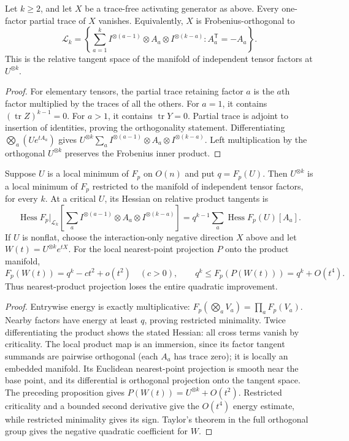 \begin{proposition}
Let $k\ge2$, and let $X$ be a trace-free activating generator as above.
Every one-factor partial trace of $X$ vanishes. Equivalently, $X$ is
Frobenius-orthogonal to
\[
 \mathcal L_k=\left\{
 \sum_{a=1}^k I^{\otimes(a-1)}\otimes A_a\otimes
 I^{\otimes(k-a)}: A_a^{\mathsf T}=-A_a\right\}.
\]
This is the relative tangent space of the manifold of independent
tensor factors at $U^{\otimes k}$.
\end{proposition}
\begin{proof}
For elementary tensors, the partial trace retaining factor $a$ is
the $a$th factor multiplied by the traces of all the others.
For $a=1$, it contains $(\operatorname{tr}Z)^{k-1}=0$.
For $a>1$, it contains $\operatorname{tr}Y=0$. Partial trace is adjoint
to insertion of identities, proving the orthogonality statement.
Differentiating $\bigotimes_a(Ue^{tA_a})$ gives
$U^{\otimes k}\sum_a I^{\otimes(a-1)}\otimes A_a\otimes
I^{\otimes(k-a)}$. Left multiplication by the orthogonal
$U^{\otimes k}$ preserves the Frobenius inner product.
\end{proof}

\begin{proposition}
Suppose $U$ is a local minimum of $F_p$ on $O(n)$ and put $q=F_p(U)$.
Then $U^{\otimes k}$ is a local minimum of $F_p$ restricted to the
manifold of independent tensor factors, for every $k$. At a critical
$U$, its Hessian on relative product tangents is
\[
 \operatorname{Hess}F_p\big|_{\mathcal L_k}
 \left[\sum_a I^{\otimes(a-1)}\otimes A_a\otimes
 I^{\otimes(k-a)}\right]
 =q^{k-1}\sum_a \operatorname{Hess}F_p(U)[A_a].
\]
If $U$ is nonflat, choose the interaction-only negative direction $X$
above and let $W(t)=U^{\otimes k}e^{tX}$. For the local nearest-point
projection $P$ onto the product manifold,
\[
 F_p(W(t))=q^k-c t^2+o(t^2)\quad(c>0),\qquad
 q^k\le F_p(P(W(t)))=q^k+O(t^4).
\]
Thus nearest-product projection loses the entire quadratic improvement.
\end{proposition}
\begin{proof}
Entrywise energy is exactly multiplicative:
$F_p(\bigotimes_a V_a)=\prod_a F_p(V_a)$.
Nearby factors have energy at least $q$, proving restricted minimality.
Twice differentiating the product shows the stated Hessian: all cross
terms vanish by criticality. The local product map is an immersion,
since its factor tangent summands are pairwise orthogonal (each $A_a$
has trace zero); it is locally an embedded manifold. Its Euclidean
nearest-point projection is smooth near the base point, and its
differential is orthogonal projection onto the tangent space.
The preceding proposition gives
$P(W(t))=U^{\otimes k}+O(t^2)$. Restricted criticality and a bounded
second derivative give the $O(t^4)$ energy estimate, while restricted
minimality gives its sign. Taylor's theorem in the full orthogonal
group gives the negative quadratic coefficient for $W$.
\end{proof}

